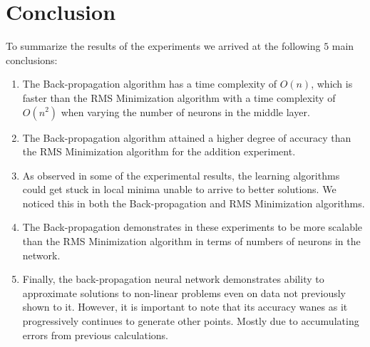 \documentclass[11pt]{article}
\begin{document}


\section{Conclusion} %
\label{sec:conclusion}

To summarize the results of the experiments we arrived at the following $5$ main conclusions:

\begin{enumerate}

 \item The Back-propagation algorithm has a time complexity of $O(n)$, which is faster than the RMS Minimization algorithm with a time
complexity of $O(n^{2})$ when varying the number of neurons in the middle layer.

\item The Back-propagation algorithm attained a higher degree of accuracy than the RMS Minimization algorithm for the addition
experiment.

\item As observed in some of the experimental results, the learning algorithms could get stuck in local minima unable to arrive to
better solutions. We noticed this in both the Back-propagation and RMS Minimization algorithms.

\item The Back-propagation demonstrates in these experiments to be more scalable than the RMS Minimization algorithm in terms of numbers
of neurons in the network.

\item Finally, the back-propagation neural network demonstrates ability to approximate solutions to non-linear problems even on data not
previously shown to it. However, it is important to note that its accuracy wanes as it progressively continues to generate other points.
Mostly due to accumulating errors from previous calculations.
	
\end{enumerate}



\end{document}
